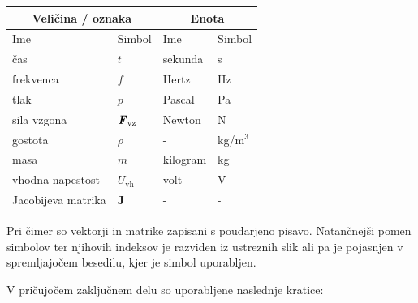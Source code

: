 \documentclass[a4paper,twoside,openright,12pt,slovene]{book}
\begin{document}
\begin{center}
    \begin{tabular}{*{4}{l}} \hline
        \multicolumn{2}{c}{\bf{Veličina / oznaka}}           & \multicolumn{2}{c}{\bf{Enota}} \\ \hline
        Ime                & Simbol                          & Ime      & Simbol              \\ \hline
        čas                & $t$                             & sekunda  & s                   \\
        frekvenca          & $f$                             & Hertz    & Hz                  \\
        tlak               & $p$                             & Pascal   & Pa                  \\
        sila vzgona        & $\textbf{\textit{F}}_\text{vz}$ & Newton   & N                   \\
        gostota            & $\rho$                          & -        & kg/m$^3$            \\
        masa               & $m$                             & kilogram & kg                  \\
        vhodna napestost   & $U_\text{vh}$                   & volt     & V                   \\
        Jacobijeva matrika & $\mathbf{J}$                    & -        & -                   \\ \hline
    \end{tabular}
\end{center}

Pri čimer so vektorji in matrike zapisani s poudarjeno pisavo. Natančnejši pomen simbolov ter njihovih indeksov je razviden iz ustreznih slik ali pa je pojasnjen v spremljajočem besedilu, kjer je simbol uporabljen.

\seznamkratic
V pričujočem zaključnem delu so uporabljene naslednje kratice:
\end{document}
